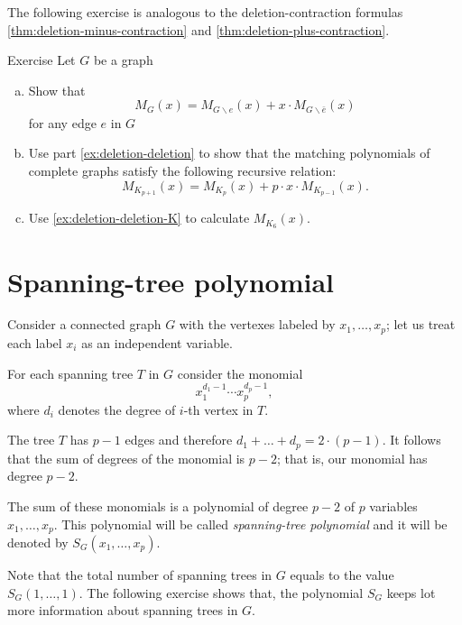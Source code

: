 The following exercise is analogous to the deletion-contraction formulas \ref{thm:deletion-minus-contraction} and \ref{thm:deletion-plus-contraction}.

\begin{thm}{Exercise}\label{ex:deletion-deletion-total}
Let $G$ be a graph
\begin{enumerate}[(a)]
\item\label{ex:deletion-deletion} Show that
\[M_G(x)=M_{G\backslash e}(x)+x\cdot M_{G\backslash \bar e}(x)\]
for any edge $e$ in $G$

\item\label{ex:deletion-deletion-K} Use part \ref{ex:deletion-deletion} to show that the matching polynomials of complete graphs satisfy the following recursive relation:
\[M_{K_{p+1}}(x)=M_{K_{p}}(x)+p\cdot x\cdot M_{K_{p-1}}(x).\]

\item Use \ref{ex:deletion-deletion-K} to calculate $M_{K_6}(x)$. 
\end{enumerate}

\end{thm}

\section*{Spanning-tree polynomial}

Consider a connected graph $G$ with the vertexes labeled by $x_1,\dots,x_p$;
let us treat each label $x_i$ as an independent variable.

For each spanning tree $T$ in $G$ consider the monomial 
\[x_1^{d_1-1}\cdots x_p^{d_p-1},\]
where $d_i$ denotes the degree of $i$-th vertex in $T$.

The tree $T$ has $p-1$ edges and therefore 
$d_1+\dots+d_p=2\cdot(p-1)$.
It follows that the sum of degrees of the monomial is $p-2$;
that is, our monomial has degree $p-2$.

The sum of these monomials is a polynomial of degree $p-2$ of $p$ variables $x_1,\dots, x_p$.
This polynomial will be called \emph{spanning-tree polynomial} and it will be denoted by 
$S_G(x_1,\dots,x_p)$.

Note that the total number of spanning trees in $G$ equals to the value
$S_G(1,\dots,1)$.
The following exercise shows that,
the polynomial $S_G$ keeps lot more information about spanning trees in $G$.

